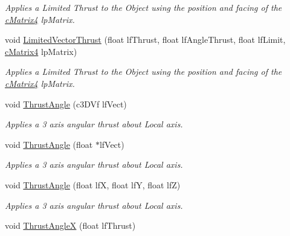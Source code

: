 \begin{DoxyCompactItemize}
\begin{DoxyCompactList}\small\item\em Applies a Limited Thrust to the Object using the position and facing of the \hyperlink{classc_matrix4}{cMatrix4} lpMatrix. \end{DoxyCompactList}\item 
\hypertarget{classc_momentum_a9ca39ec6bc76a76b95d1a81f9b195a54}{
void \hyperlink{classc_momentum_a9ca39ec6bc76a76b95d1a81f9b195a54}{LimitedVectorThrust} (float lfThrust, float lfAngleThrust, float lfLimit, \hyperlink{classc_matrix4}{cMatrix4} lpMatrix)}
\label{classc_momentum_a9ca39ec6bc76a76b95d1a81f9b195a54}

\begin{DoxyCompactList}\small\item\em Applies a Limited Thrust to the Object using the position and facing of the \hyperlink{classc_matrix4}{cMatrix4} lpMatrix. \end{DoxyCompactList}\item 
\hypertarget{classc_momentum_ae27ece977d623140f2ec64ab57b5882b}{
void \hyperlink{classc_momentum_ae27ece977d623140f2ec64ab57b5882b}{ThrustAngle} (c3DVf lfVect)}
\label{classc_momentum_ae27ece977d623140f2ec64ab57b5882b}

\begin{DoxyCompactList}\small\item\em Applies a 3 axis angular thrust about Local axis. \end{DoxyCompactList}\item 
\hypertarget{classc_momentum_a04957410ed4c847b2feee9d9f9f9cf1b}{
void \hyperlink{classc_momentum_a04957410ed4c847b2feee9d9f9f9cf1b}{ThrustAngle} (float $\ast$lfVect)}
\label{classc_momentum_a04957410ed4c847b2feee9d9f9f9cf1b}

\begin{DoxyCompactList}\small\item\em Applies a 3 axis angular thrust about Local axis. \end{DoxyCompactList}\item 
\hypertarget{classc_momentum_a286b5ad14ffcd9818b23265ed70c9855}{
void \hyperlink{classc_momentum_a286b5ad14ffcd9818b23265ed70c9855}{ThrustAngle} (float lfX, float lfY, float lfZ)}
\label{classc_momentum_a286b5ad14ffcd9818b23265ed70c9855}

\begin{DoxyCompactList}\small\item\em Applies a 3 axis angular thrust about Local axis. \end{DoxyCompactList}\item 
\hypertarget{classc_momentum_afb154e00f9bc7a8c38a2c52dfb899a21}{
void \hyperlink{classc_momentum_afb154e00f9bc7a8c38a2c52dfb899a21}{ThrustAngleX} (float lfThrust)}
\label{classc_momentum_afb154e00f9bc7a8c38a2c52dfb899a21}


\end{DoxyCompactItemize}
